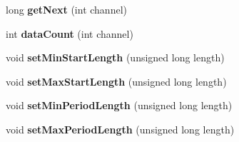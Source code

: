 \begin{DoxyCompactItemize}
long {\bfseries get\+Next} (int channel)
\item 
\mbox{\label{class_r_freceive_af36972eab4c5f65cb96ee4e4742235fb}} 
int {\bfseries data\+Count} (int channel)
\item 
\mbox{\label{class_r_freceive_a761b46a7746f9b570f7377bfc65d4746}} 
void {\bfseries set\+Min\+Start\+Length} (unsigned long length)
\item 
\mbox{\label{class_r_freceive_aa56392ddcc63456ae7429b3b6224d2b7}} 
void {\bfseries set\+Max\+Start\+Length} (unsigned long length)
\item 
\mbox{\label{class_r_freceive_a75ecab73fcfeb13218a1f59c2f51dd0f}} 
void {\bfseries set\+Min\+Period\+Length} (unsigned long length)
\item 
\mbox{\label{class_r_freceive_a64119e6557d3e1c53111870d241a5abe}} 
void {\bfseries set\+Max\+Period\+Length} (unsigned long length)
\end{DoxyCompactItemize}
